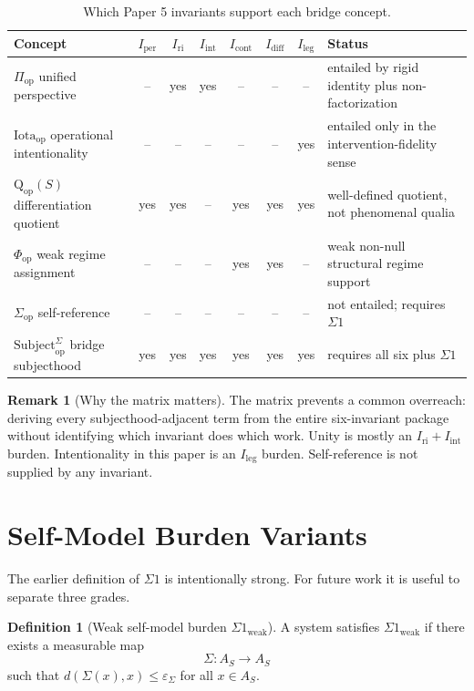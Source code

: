 \documentclass[11pt,a4paper]{article}
\theoremstyle{definition}
\newtheorem{definition}[theorem]{Definition}
\newtheorem{remark}[theorem]{Remark}
\newcommand{\Subbridge}{\mathrm{Subject}^{\Sigma}_{\mathrm{op}}}
\newcommand{\Qop}{\mathrm{Q}_{\mathrm{op}}}
\newcommand{\Sigmaop}{\Sigma_{\mathrm{op}}}
\newcommand{\Piop}{\Pi_{\mathrm{op}}}
\newcommand{\Iotaop}{\mathrm{Iota}_{\mathrm{op}}}
\newcommand{\Phiop}{\Phi_{\mathrm{op}}}
\newcommand{\Aset}{A_S}
\newcommand{\Iper}{I_{\mathrm{per}}}
\newcommand{\Iri}{I_{\mathrm{ri}}}
\newcommand{\Iint}{I_{\mathrm{int}}}
\newcommand{\Icont}{I_{\mathrm{cont}}}
\newcommand{\Idiff}{I_{\mathrm{diff}}}
\newcommand{\Ileg}{I_{\mathrm{leg}}}
\newcommand{\eps}{\varepsilon}
\begin{document}
\begin{table}[ht]
\centering
\caption{Which Paper 5 invariants support each bridge concept.}
\label{tab:component-implication}
\small
\begin{tabularx}{\textwidth}{>{\raggedright\arraybackslash}p{3.2cm} c c c c c c Y}
\toprule
Concept & $\Iper$ & $\Iri$ & $\Iint$ & $\Icont$ & $\Idiff$ & $\Ileg$ & Status \\
\midrule
$\Piop$ unified perspective & -- & yes & yes & -- & -- & -- & entailed by rigid identity plus non-factorization \\
$\Iotaop$ operational intentionality & -- & -- & -- & -- & -- & yes & entailed only in the intervention-fidelity sense \\
$\Qop(S)$ differentiation quotient & yes & yes & -- & yes & yes & yes & well-defined quotient, not phenomenal qualia \\
$\Phiop$ weak regime assignment & -- & -- & -- & yes & yes & -- & weak non-null structural regime support \\
$\Sigmaop$ self-reference & -- & -- & -- & -- & -- & -- & not entailed; requires $\Sigma1$ \\
$\Subbridge$ bridge subjecthood & yes & yes & yes & yes & yes & yes & requires all six plus $\Sigma1$ \\
\bottomrule
\end{tabularx}
\end{table}

\begin{remark}[Why the matrix matters]
The matrix prevents a common overreach: deriving every subjecthood-adjacent term
from the entire six-invariant package without identifying which invariant does
which work. Unity is mostly an $\Iri+\Iint$ burden. Intentionality in this paper
is an $\Ileg$ burden. Self-reference is not supplied by any invariant.
\end{remark}

\section{Self-Model Burden Variants}

The earlier definition of $\Sigma1$ is intentionally strong. For future work it
is useful to separate three grades.

\begin{definition}[Weak self-model burden $\Sigma1_{\mathrm{weak}}$]\label{def:sigma-weak}
A system satisfies $\Sigma1_{\mathrm{weak}}$ if there exists a measurable map
\[
\Sigma:\Aset\to\Aset
\]
such that $d(\Sigma(x),x)\le \eps_\Sigma$ for all $x\in\Aset$.
\end{definition}
\end{document}
